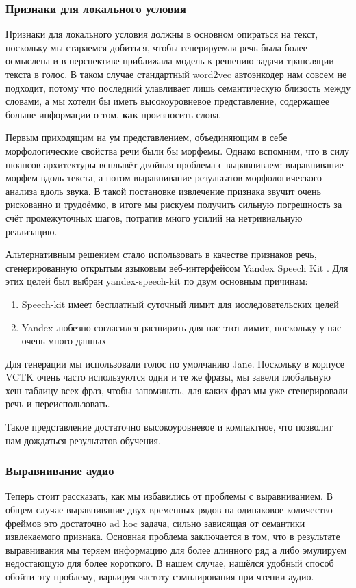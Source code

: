 \documentclass[../diploma.tex]{subfiles}
\begin{document}
\subsubsection{Признаки для локального условия}
Признаки для локального условия должны в основном опираться на текст, поскольку мы стараемся добиться, чтобы генерируемая речь была более осмыслена и в перспективе приближала модель к решению задачи трансляции текста в голос.
В таком случае стандартный word2vec автоэнкодер нам совсем не подходит, потому что последний улавливает лишь семантическую близость между словами, а мы хотели бы иметь высокоуровневое представление, содержащее больше информации о том, \textbf{как} произносить слова.

Первым приходящим на ум представлением, объединяющим в себе морфологические свойства речи были бы морфемы.
Однако вспомним, что в силу нюансов архитектуры всплывёт двойная проблема с выравниваем: выравнивание морфем вдоль текста, а потом выравнивание результатов морфологического анализа вдоль звука. 
В такой постановке извлечение признака звучит очень рискованно и трудоёмко, в итоге мы рискуем получить сильную погрешность за счёт промежуточных шагов, потратив много усилий на нетривиальную реализацию.

Альтернативным решением стало использовать в качестве признаков речь, сгенерированную открытым языковым веб-интерфейсом Yandex Speech Kit \cite{online:speech_kit}.
Для этих целей был выбран yandex-speech-kit по двум основным причинам:
\begin{enumerate}
    \item Speech-kit имеет бесплатный суточный лимит для исследовательских целей
    \item Yandex любезно согласился расширить для нас этот лимит, поскольку у нас очень много данных 
\end{enumerate}
Для генерации мы использовали голос по умолчанию Jane. Поскольку в корпусе VCTK очень часто используются одни и те же фразы, мы завели глобальную хеш-таблицу всех фраз, чтобы запоминать, для каких фраз мы уже сгенерировали речь и переиспользовать.

Такое представление достаточно высокоуровневое и компактное, что позволит нам дождаться результатов обучения.

\subsubsection{Выравнивание аудио}
Теперь стоит рассказать, как мы избавились от проблемы с выравниванием.
В общем случае выравнивание двух временных рядов на одинаковое количество фреймов это достаточно ad hoc задача, сильно зависящая от семантики извлекаемого признака. Основная проблема заключается в том, что в результате выравнивания мы теряем информацию для более длинного ряд а либо эмулируем недостающую для более короткого. В нашем случае, нашёлся удобный способ обойти эту проблему, варьируя частоту сэмплирования при чтении аудио.
\end{document}
